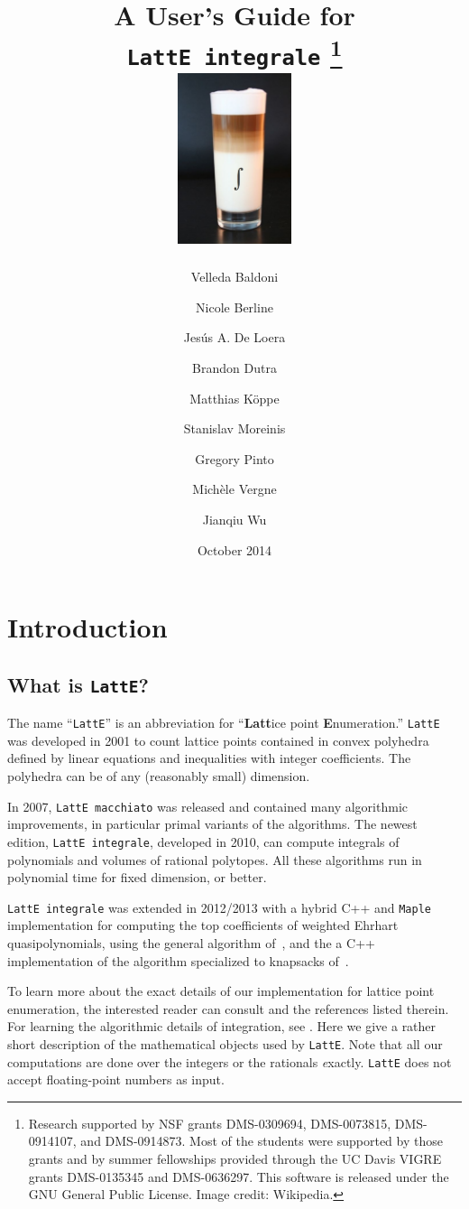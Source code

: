 \documentclass{article}
\title{A User's Guide for\\ {\tt LattE integrale} \latteV 
\footnote{Research supported by NSF grants DMS-0309694, 
DMS-0073815, DMS-0914107, and DMS-0914873.
Most of the students were supported by those
grants and by summer fellowships provided through the UC Davis VIGRE grants
DMS-0135345 and DMS-0636297. This
software is released under the GNU General Public License.  Image credit: Wikipedia.}
\\[4ex] \includegraphics[width=0.25\textwidth]{latte-integrale.jpg}
}%
\author{
Velleda Baldoni \and
Nicole Berline \and 
Jes\'us A. De Loera \and
Brandon Dutra \and
Matthias K\"oppe \and 
Stanislav Moreinis \and
Gregory Pinto \and
Mich\`ele Vergne \and
Jianqiu Wu \and
}
\date{October 2014}
\newcommand{\latte}{{\tt LattE}\xspace}
\newcommand{\latteInt}{{\tt LattE integrale}\xspace}
\newcommand{\maple}{{\tt Maple}\xspace}
\begin{document}
\maketitle{}

\newpage

\tableofcontents

\newpage

\section{Introduction}

\subsection{What is {\tt LattE}?} \label{intro}

The name ``{\tt LattE}'' is an abbreviation for ``{\bf Latt}ice point 
{\bf E}numeration.'' \latte was developed in 2001 to count lattice points contained in 
convex polyhedra defined by linear equations and inequalities with 
integer coefficients. The polyhedra can be of any (reasonably small) 
dimension. 

In 2007, {\tt LattE macchiato} was released and contained many 
algorithmic improvements, in particular primal variants of the algorithms. The newest edition, \latteInt, developed
in 2010, can compute integrals of polynomials and volumes of rational polytopes. 
All these algorithms run in polynomial
time for fixed dimension, or better.
 
\latteInt was extended in 2012/2013 with a hybrid C++ and \maple
implementation for computing the top coefficients of weighted Ehrhart
quasipolynomials, using the general algorithm of~\cite{so-called-paper-1}, 
and the a C++ implementation of the algorithm specialized to knapsacks
of~\cite{baldoni-et-al:denumerant-fpsac,baldoni-et-al:denumerant-full-paper}. 

To
learn more about the exact details of our implementation for lattice point enumeration, the interested reader can consult 
\cite{koeppe:irrational-barvinok, latte1, deloera-hemmecke-koeppe:book} and the references listed therein. 
For learning the algorithmic details of integration, see \cite{howToIntegratePolynomialSimplex, latte-integrale-paper}. Here we
give a rather short description of the mathematical objects used by
{\tt LattE}. Note that all our computations are done over the integers or the rationals {\emph exactly}.
\latte does not accept floating-point numbers as input. 
\end{document}
